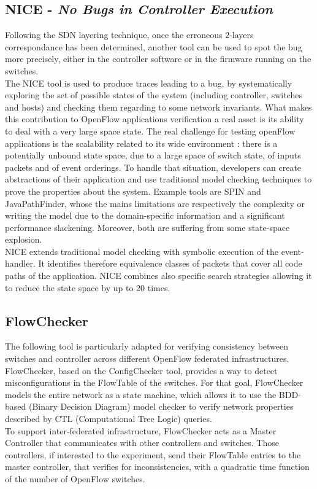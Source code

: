 \documentclass[10pt,article]{IEEEtran}
\begin{document}
\subsection{NICE - \textit{No Bugs in Controller Execution}}

Following the SDN layering technique, once the erroneous 2-layers correspondance has been determined, another tool can be used to spot the bug more precisely, either in the controller software or in the firmware running on the switches.\\
The NICE tool is used to produce traces leading to a bug, by systematically exploring the set of possible states of the system (including controller, switches and hosts) and checking them regarding to some network invariants\cite{Canini:2012:NWT:2228298.2228312}. What makes this contribution to OpenFlow applications verification a real asset is its ability to deal with a very large space state. The real challenge for testing openFlow applications is the scalability related to its wide environment : there is a potentially unbound state space, due to a large space of switch state, of inputs packets and of event orderings\cite{Canini:2012:NWT:2228298.2228312}. To handle that situation, developers can create abstractions of their application and use traditional model checking techniques to prove the properties about the system. Example tools are SPIN and JavaPathFinder, whose the mains limitations are respectively the complexity or writing the model due to the domain-specific information and a significant performance slackening\cite{Peresini:2011:YOA:2079327.2079345}. Moreover, both are suffering from some state-space explosion.\\
NICE extends traditional model checking with symbolic execution of the event-handler. It identifies therefore equivalence classes of packets that cover all code paths of the application. NICE combines also specific search strategies allowing it to reduce the state space by up to 20 times\cite{Canini:2012:NWT:2228298.2228312}.

\subsection{FlowChecker}

The following tool is particularly adapted for verifying consistency between switches and controller across different OpenFlow federated infrastructures. FlowChecker, based on the ConfigChecker tool, provides a way to detect misconfigurations in the FlowTable of the switches\cite{canini2011automating}. For that goal, FlowChecker models the entire network as a state machine, which allows it to use the BDD-based (Binary Decision Diagram) model checker to verify network properties described by CTL (Computational Tree Logic) queries\cite{Al-Shaer:2010:FCA:1866898.1866905}.\\
To support inter-federated infrastructure, FlowChecker acts as a Master Controller that communicates with other controllers and switches. Those controllers, if interested to the experiment, send their FlowTable entries to the master controller, that verifies for inconsistencies, with a quadratic time function of the number of OpenFlow switches\cite{Al-Shaer:2010:FCA:1866898.1866905}.
\end{document}
